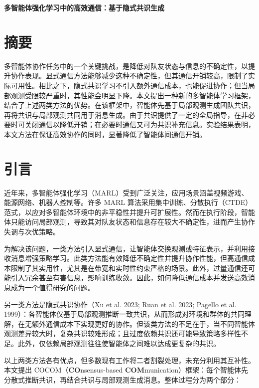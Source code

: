 
\begin{center}
{\sanhao\bfseries 多智能体强化学习中的高效通信：基于隐式共识生成}
\end{center}

\section*{摘要}

多智能体协作任务中的一个关键挑战，是降低对队友状态与信息的不确定性，以提升协作表现。显式通信方法能够减少这种不确定性，但其通信开销较高，限制了实际可用性。相比之下，隐式共识学习不引入额外通信成本，也能促进协作；但当局部观测受限较严重时，其性能会明显下降。本文提出一种新的多智能体学习框架，结合了上述两类方法的优势。在该框架中，智能体先基于局部观测生成团队共识，再将共识与局部观测共同用于消息生成。由于共识提供了一定的全局指导，在非必要时可关闭通信以降低开销；在必要时通信又可为共识补充信息。实验结果表明，本文方法在保证高效协作的同时，显著降低了智能体间通信开销。

\section*{引言}

近年来，多智能体强化学习（MARL）受到广泛关注，应用场景涵盖视频游戏、能源网络、机器人控制等。许多 MARL 算法采用集中训练、分散执行（CTDE）范式，以应对多智能体环境中的非平稳性并提升可扩展性。然而在执行阶段，智能体只能访问局部观测，导致其对队友状态和信息存在较大不确定性，进而产生协作失调与次优策略。

为解决该问题，一类方法引入显式通信，让智能体交换观测或特征表示，并利用接收消息增强策略学习。此类方法能有效降低不确定性并提升协作性能，但高通信成本限制了其实用性，尤其是在带宽和实时性约束严格的场景。此外，过量通信还可能引入冗余甚至有害信息，影响训练收敛。因此，如何降低通信成本并发送高效消息成为一个值得研究的问题。

另一类方法是隐式共识协作（Xu et al. 2023; Ruan et al. 2023; Pagello et al. 1999）：各智能体仅基于局部观测推断一致共识，从而形成对环境和群体的共同理解，在无额外通信成本下实现更好的协作。但该类方法的不足在于，当不同智能体观测差异较大时，复杂共识较难形成；且过度依赖共识还可能导致策略多样性不足。此外，仅依赖局部观测往往使智能体之间难以达成更复杂的共识。

以上两类方法各有优点，但多数现有工作将二者割裂处理，未充分利用其互补性。本文提出 COCOM（\textbf{CO}nsensus-based \textbf{COM}munication）框架：每个智能体先分散式推断共识，再结合共识与局部观测生成消息。整体过程分为两个部分：

